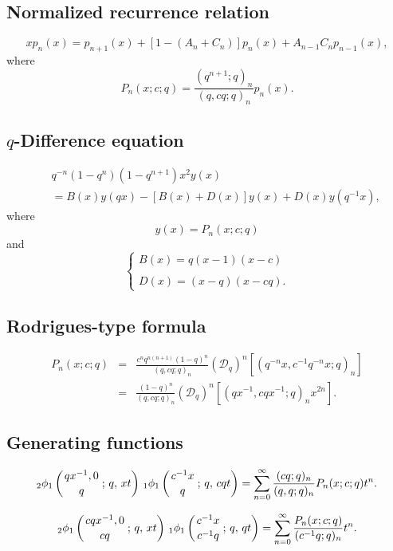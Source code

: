 \documentclass[envcountchap,graybox]{svmono}
\newcommand{\qhyp}[5]{\mbox{}_{#1}{\phi}_{#2}
\left(\genfrac{}{}{0pt}{}{#3}{#4}\,;\,q,\,#5\right)}
\begin{document}
\subsection*{Normalized recurrence relation}
\begin{equation}
\label{NormRecBigqLegendre}
xp_n(x)=p_{n+1}(x)+\left[1-(A_n+C_n)\right]p_n(x)+A_{n-1}C_np_{n-1}(x),
\end{equation}
where
$$P_n(x;c;q)=\frac{(q^{n+1};q)_n}{(q,cq;q)_n}p_n(x).$$

\subsection*{$q$-Difference equation}
\begin{eqnarray}
\label{dvBigqLegendre}
& &q^{-n}(1-q^n)(1-q^{n+1})x^2y(x)\nonumber\\
& &{}=B(x)y(qx)-\left[B(x)+D(x)\right]y(x)+D(x)y(q^{-1}x),
\end{eqnarray}
where
$$y(x)=P_n(x;c;q)$$
and
$$\left\{\begin{array}{l}\displaystyle B(x)=q(x-1)(x-c)\\
\\
\displaystyle D(x)=(x-q)(x-cq).\end{array}\right.$$

\subsection*{Rodrigues-type formula}
\begin{eqnarray}
\label{RodBigqLegendre}
P_n(x;c;q)&=&\frac{c^nq^{n(n+1)}(1-q)^n}{(q,cq;q)_n}
\left(\mathcal{D}_q\right)^n\left[(q^{-n}x,c^{-1}q^{-n}x;q)_n\right]\\
&=&\frac{(1-q)^n}{(q,cq;q)_n}\left(\mathcal{D}_q\right)^n
\left[(qx^{-1},cqx^{-1};q)_nx^{2n}\right].\nonumber
\end{eqnarray}

\subsection*{Generating functions}
\begin{equation}
\label{GenBigqLegendre1}
\qhyp{2}{1}{qx^{-1},0}{q}{xt}\,\qhyp{1}{1}{c^{-1}x}{q}{cqt}
=\sum_{n=0}^{\infty}\frac{(cq;q)_n}{(q,q;q)_n}P_n(x;c;q)t^n.
\end{equation}

\begin{equation}
\label{GenBigqLegendre2}
\qhyp{2}{1}{cqx^{-1},0}{cq}{xt}\,\qhyp{1}{1}{c^{-1}x}{c^{-1}q}{qt}
=\sum_{n=0}^{\infty}\frac{P_n(x;c;q)}{(c^{-1}q;q)_n}t^n.
\end{equation}
\end{document}
